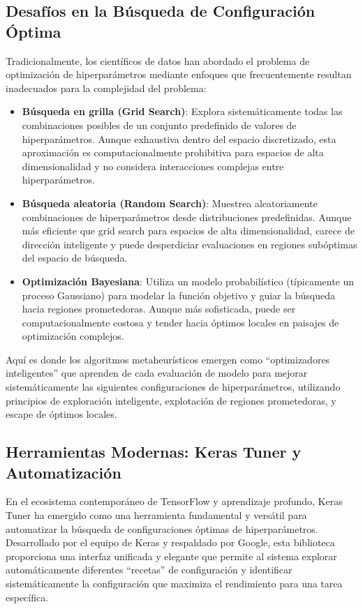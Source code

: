 \subsection{Desafíos en la Búsqueda de Configuración Óptima}

Tradicionalmente, los científicos de datos han abordado el problema de optimización de hiperparámetros mediante enfoques que frecuentemente resultan inadecuados para la complejidad del problema:

\begin{itemize}
    \item \textbf{Búsqueda en grilla (Grid Search)}: Explora sistemáticamente todas las combinaciones posibles de un conjunto predefinido de valores de hiperparámetros. Aunque exhaustiva dentro del espacio discretizado, esta aproximación es computacionalmente prohibitiva para espacios de alta dimensionalidad y no considera interacciones complejas entre hiperparámetros.
    \item \textbf{Búsqueda aleatoria (Random Search)}: Muestrea aleatoriamente combinaciones de hiperparámetros desde distribuciones predefinidas. Aunque más eficiente que grid search para espacios de alta dimensionalidad, carece de dirección inteligente y puede desperdiciar evaluaciones en regiones subóptimas del espacio de búsqueda.
    \item \textbf{Optimización Bayesiana}: Utiliza un modelo probabilístico (típicamente un proceso Gaussiano) para modelar la función objetivo y guiar la búsqueda hacia regiones prometedoras. Aunque más sofisticada, puede ser computacionalmente costosa y tender hacia óptimos locales en paisajes de optimización complejos.
\end{itemize}

Aquí es donde los algoritmos metaheurísticos emergen como ``optimizadores inteligentes'' que aprenden de cada evaluación de modelo para mejorar sistemáticamente las siguientes configuraciones de hiperparámetros, utilizando principios de exploración inteligente, explotación de regiones prometedoras, y escape de óptimos locales.

\subsection{Herramientas Modernas: Keras Tuner y Automatización}

En el ecosistema contemporáneo de TensorFlow y aprendizaje profundo, Keras Tuner \cite{omalley2020hyperparameter} ha emergido como una herramienta fundamental y versátil para automatizar la búsqueda de configuraciones óptimas de hiperparámetros. Desarrollado por el equipo de Keras y respaldado por Google, esta biblioteca proporciona una interfaz unificada y elegante que permite al sistema explorar automáticamente diferentes ``recetas'' de configuración y identificar sistemáticamente la configuración que maximiza el rendimiento para una tarea específica.

